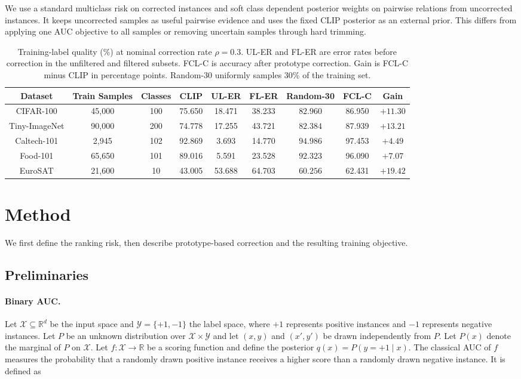 \documentclass[10pt,twocolumn,letterpaper]{article}
\begin{document}
We use a standard multiclass risk on corrected instances and soft class dependent posterior weights on pairwise relations from uncorrected instances. It keeps uncorrected samples as useful pairwise evidence and uses the fixed CLIP posterior as an external prior. This differs from applying one AUC objective to all samples or removing uncertain samples through hard trimming.

\begin{table}[t]
\caption{Training-label quality (\%) at nominal correction rate $\rho=0.3$. UL-ER and FL-ER are error rates before correction in the unfiltered and filtered subsets. FCL-C is accuracy after prototype correction. Gain is FCL-C minus CLIP in percentage points. Random-30 uniformly samples 30\% of the training set.}
\label{tab:fcls-annotation}
\centering
\scriptsize
\setlength{\tabcolsep}{2.5pt}
\begin{tabular*}{\textwidth}{@{\extracolsep{\fill}}ccccccccc}
\toprule
Dataset & Train Samples &  Classes & CLIP & UL-ER & FL-ER & Random-30 & FCL-C & Gain \\
\midrule
CIFAR-100 & 45,000 & 100 & 75.650 & 18.471 & 38.233 & $82.960$  & 86.950 & $+11.30$ \\
Tiny-ImageNet & 90,000 & 200 & 74.778 & 17.255 & 43.721 & $82.384$  & 87.939 & $+13.21$ \\
Caltech-101 & 2,945 & 102 & 92.869 & 3.693 & 14.770 & $94.986$  & 97.453 & $+4.49$ \\
Food-101 & 65,650 & 101 & 89.016 & 5.591 & 23.528 & $92.323$  & 96.090 & $+7.07$ \\
EuroSAT & 21,600 & 10 & 43.005 & 53.688 & 64.703 & $60.256$  & 62.431 & $+19.42$ \\
\bottomrule
\end{tabular*}
\end{table}


\section{Method}
We first define the ranking risk, then describe prototype-based correction and the resulting training objective.
\subsection{Preliminaries}
\paragraph{Binary AUC.}
Let $\mathcal{X}\subseteq\mathbb{R}^{d}$ be the input space and $\mathcal{Y}=\{+1,-1\}$ the label space, where $+1$ represents positive instances and $-1$ represents negative instances. Let $P$ be an unknown distribution over $\mathcal{X}\times\mathcal{Y}$ and let $(x,y)$ and $(x',y')$ be drawn independently from $P$. Let $P(x)$ denote the marginal of $P$ on $\mathcal{X}$. Let $f\!:\mathcal{X}\to\mathbb{R}$ be a scoring function and define the posterior $q(x)=P(y=+1\mid x)$. The classical AUC of $f$ measures the probability that a randomly drawn positive instance receives a higher score than a randomly drawn negative instance. It is defined as
\end{document}
